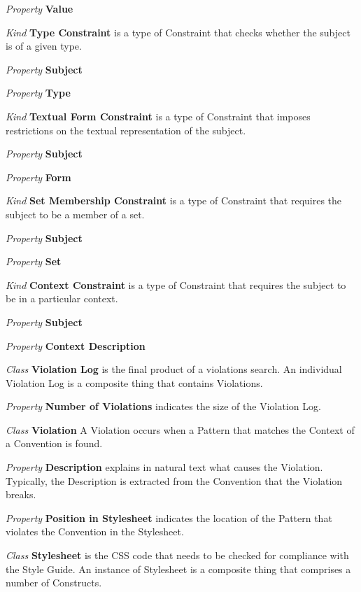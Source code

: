\documentclass[parskip=full]{uvamscse}
\begin{document}
\begin{description}
\textit{Property} \textbf{Value}


\item\textit{Kind} \textbf{Type Constraint} is a type of Constraint that checks whether the subject is of a given type.

\textit{Property} \textbf{Subject} 

\textit{Property} \textbf{Type}


\item\textit{Kind} \textbf{Textual Form Constraint} is a type of Constraint that imposes restrictions on the textual representation of the subject.

\textit{Property} \textbf{Subject} 

\textit{Property} \textbf{Form}


\item\textit{Kind} \textbf{Set Membership Constraint} is a type of Constraint that requires the subject to be a member of a set.

\textit{Property} \textbf{Subject} 

\textit{Property} \textbf{Set}


\item\textit{Kind} \textbf{Context Constraint} is a type of Constraint that requires the subject to be in a particular context.

\textit{Property} \textbf{Subject} 

\textit{Property} \textbf{Context Description}


\item\textit{Class} \textbf{Violation Log} is the final product of a violations search. An individual Violation Log is a composite thing that contains Violations.

\textit{Property} \textbf{Number of Violations} indicates the size of the Violation Log. 


\item\textit{Class} \textbf{Violation} A Violation occurs when a Pattern that matches the Context of a Convention is found.

\textit{Property} \textbf{Description} explains in natural text what causes the Violation. Typically, the Description is extracted from the Convention that the Violation breaks.

\textit{Property} \textbf{Position in Stylesheet} indicates the location of the Pattern that violates the Convention in the Stylesheet. 


\item\textit{Class} \textbf{Stylesheet} is the CSS code that needs to be checked for compliance with the Style Guide. An instance of Stylesheet is a composite thing that comprises a number of Constructs.


\end{description}
\end{document}
